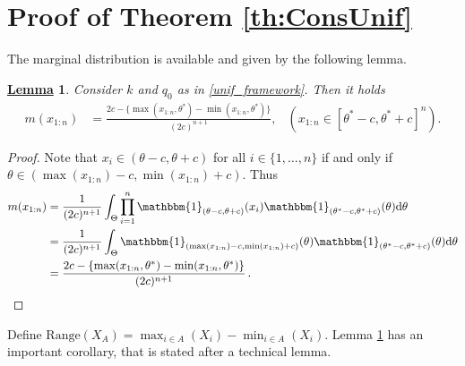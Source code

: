 \documentclass[12pt]{article}
\newtheorem{Lem}{\underline{\bf Lemma}}
\begin{document}
\section{Proof of Theorem \ref{th:ConsUnif}}
The marginal distribution is available and given by the following lemma.
\begin{Lem}\label{marginal_uniform}
Consider $k$ and $q_0$ 
as in \eqref{unif_framework}. Then it holds
\begin{align*}
m(x_{1:n})  &= \frac{2c - \{\max(x_{1:n},\theta^\ast)-\min(x_{1:n},\theta^\ast)\}}{(2c)^{n+1}},
&(x_{1:n}\in[\theta^\ast-c, \theta^\ast+c]^n).
\end{align*}
\end{Lem}

\begin{proof}%
Note that $ x_i\in(\theta-c,\theta+c)$ for all $i \in \{1, \dots, n\}$ if and only if $\theta\in(\max(x_{1:n})-c ,\min(x_{1:n})+c)$. Thus
\begin{align*}
m(x_{1:n}) &= \frac{1}{(2c)^{n+1}} \int_{\Theta}\prod_{i = 1}^n \mathbbm{1}_{(\theta-c,\theta+c)}(x_i) \mathbbm{1}_{(\theta^\ast-c,\theta^\ast+c)}(\theta) \mathrm{d}\theta
\\ &=
\frac{1}{(2c)^{n+1}} \int_{\Theta}\mathbbm{1}_{(\max(x_{1:n})-c,\min(x_{1:n})+c)}(\theta) \mathbbm{1}_{(\theta^\ast-c,\theta^\ast+c)}(\theta) \mathrm{d}\theta
\\&=
\frac{2c- \{\max(x_{1:n},\theta^\ast)-\min(x_{1:n},\theta^\ast)\}}{(2c)^{n+1}}\,.
\end{align*}
\end{proof}
Define $\text{Range}(X_A) = \max_{i \in A} \left( X_{i}\right)-\min_{i \in A}\left(X_{i} \right)$. Lemma \ref{marginal_uniform} has an important corollary, that is stated after a technical lemma.
\end{document}
